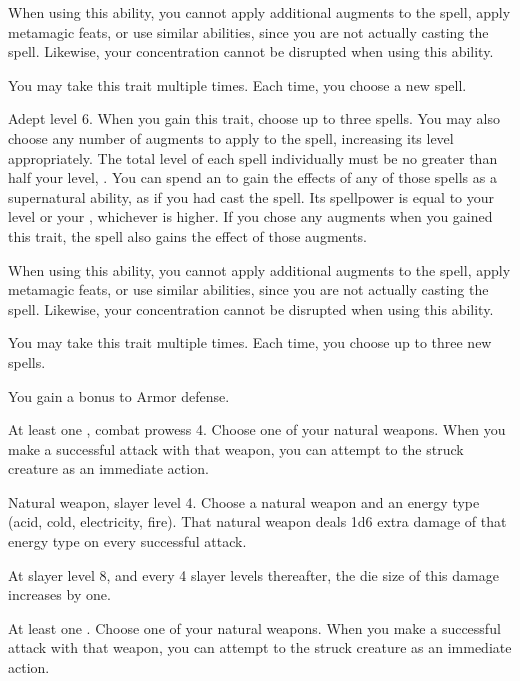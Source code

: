     When using this ability, you cannot apply additional augments to the spell, apply metamagic feats, or use similar abilities, since you are not actually casting the spell.
    Likewise, your concentration cannot be disrupted when using this ability.

     You may take this trait multiple times.
    Each time, you choose a new spell.

    \featpre Adept level 6.
    \featben When you gain this trait, choose up to three spells.
    You may also choose any number of augments to apply to the spell, increasing its level appropriately.
    The total level of each spell individually must be no greater than half your level, .
    You can spend an  to gain the effects of any of those spells as a supernatural ability, as if you had cast the spell.
    Its spellpower is equal to your level or your , whichever is higher.
    If you chose any augments when you gained this trait, the spell also gains the effect of those augments.

    When using this ability, you cannot apply additional augments to the spell, apply metamagic feats, or use similar abilities, since you are not actually casting the spell.
    Likewise, your concentration cannot be disrupted when using this ability.

     You may take this trait multiple times.
    Each time, you choose up to three new spells.

    \featben You gain a  bonus to Armor defense.

    \featpre At least one , combat prowess 4.
    \featben Choose one of your natural weapons.
    When you make a successful attack with that weapon, you can attempt to  the struck creature as an immediate action.

    \featpre Natural weapon, slayer level 4.
    \featben Choose a natural weapon and an energy type (acid, cold, electricity, fire).
    That natural weapon deals 1d6 extra damage of that energy type on every successful attack.

    At slayer level 8, and every 4 slayer levels thereafter, the die size of this damage increases by one.

    \featpre At least one .
    \featben Choose one of your natural weapons.
    When you make a successful attack with that weapon, you can attempt to  the struck creature as an immediate action.

